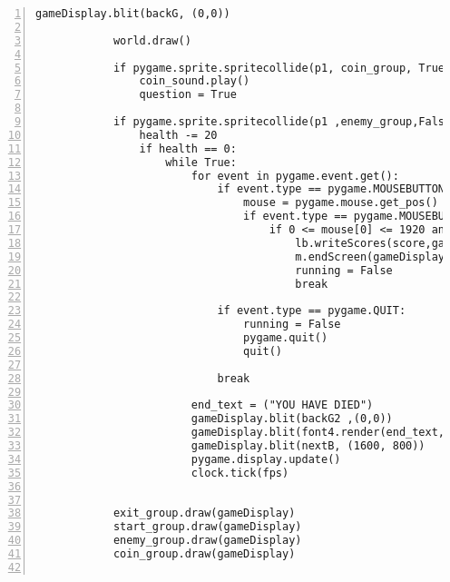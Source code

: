 \documentclass[12pt]{report}
\begin{document}
\begin{Verbatim}[numbers=left, frame=single]
            gameDisplay.blit(backG, (0,0))                                                              

            world.draw()                                                                                

            if pygame.sprite.spritecollide(p1, coin_group, True):
                coin_sound.play()
                question = True

            if pygame.sprite.spritecollide(p1 ,enemy_group,False):
                health -= 20
                if health == 0:
                    while True:                                                             
                        for event in pygame.event.get():
                            if event.type == pygame.MOUSEBUTTONDOWN:
                                mouse = pygame.mouse.get_pos()
                                if event.type == pygame.MOUSEBUTTONDOWN:
                                    if 0 <= mouse[0] <= 1920 and 0 <= mouse[1] <= 1080:
                                        lb.writeScores(score,gameDisplay,fps,username)
                                        m.endScreen(gameDisplay,fps)
                                        running = False
                                        break

                            if event.type == pygame.QUIT:                                                               
                                running = False
                                pygame.quit()
                                quit()
                                
                            break
                        
                        end_text = ("YOU HAVE DIED")
                        gameDisplay.blit(backG2 ,(0,0))
                        gameDisplay.blit(font4.render(end_text, True, (255, 255, 255)), (50, 50))
                        gameDisplay.blit(nextB, (1600, 800))
                        pygame.display.update()
                        clock.tick(fps)
                

            exit_group.draw(gameDisplay)
            start_group.draw(gameDisplay)
            enemy_group.draw(gameDisplay)
            coin_group.draw(gameDisplay)


\end{Verbatim}
\end{document}
